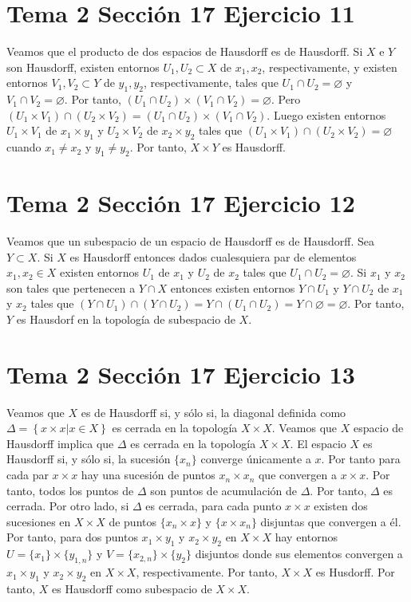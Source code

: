 \documentclass{article}
\begin{document}
\section{Tema 2 Sección 17 Ejercicio 11}
Veamos que el producto de dos espacios de Hausdorff es de Hausdorff. Si $X$ e $Y$ son Hausdorff, existen entornos $U_1,U_2\subset X$ de $x_1,x_2$, respectivamente, y existen entornos $V_1,V_2\subset Y$ de $y_1,y_2$, respectivamente, tales que $U_1\cap U_2=\varnothing$ y $V_1\cap V_2=\varnothing$. Por tanto, $(U_1\cap U_2)\times (V_1\cap V_2)=\varnothing$. Pero $(U_1\times V_1)\cap (U_2\times V_2)=(U_1\cap U_2)\times (V_1\cap V_2)$. Luego existen entornos $U_1\times V_1$ de $x_1 \times y_1$ y $U_2\times V_2$ de $x_2 \times y_2$ tales que $(U_1\times V_1)\cap (U_2\times V_2)=\varnothing$ cuando $x_1\neq  x_2$ y $y_1\neq  y_2$. Por tanto, $X\times Y$ es Hausdorff.
\section{Tema 2 Sección 17 Ejercicio 12}
Veamos que un subespacio de un espacio de Hausdorff es de Hausdorff. Sea $Y\subset X$. Si $X$ es Hausdorff entonces dados cualesquiera par de elementos $x_1,x_2\in X$ existen entornos $U_1$ de $x_1$ y $U_2$ de $x_2$ tales que $U_1\cap U_2=\varnothing$. Si $x_1$ y $x_2$ son tales que pertenecen a $Y\cap X$ entonces existen  entornos $Y\cap U_1$ y $Y\cap U_2$ de $x_1$ y $x_2$ tales que $(Y\cap U_1)\cap (Y\cap U_2)=Y\cap (U_1\cap U_2)=Y \cap \varnothing =\varnothing$. Por tanto, $Y$ es Hausdorf en la topología de subespacio de $X$.
\section{Tema 2 Sección 17 Ejercicio 13}
Veamos que $X$ es de Hausdorff si, y sólo si, la diagonal definida como $\Delta= \left\{x\times x \vert x\in X\right\}$ es cerrada en la topología $X\times X$. Veamos que $X$ espacio de Hausdorff implica que $\Delta$ es cerrada en la topología $X\times X$. El espacio $X$ es Hausdorff si, y sólo si, la sucesión $\{x_n\}$ converge únicamente a $x$. Por tanto para cada par $x\times x$ hay una sucesión de puntos $x_n\times x_n$ que convergen a $x\times  x$. Por tanto, todos los puntos de $\Delta$ son puntos de acumulación de $\Delta$. Por tanto, $\Delta$ es cerrada. Por otro lado, si $\Delta$ es cerrada, para cada punto $x\times x$ existen dos sucesiones en $X\times X$ de puntos $\{x_n\times x\}$ y $\{x\times x_n\}$ disjuntas que convergen a él. Por tanto, para dos puntos $x_1\times y_1$ y $x_2\times y_2$ en $X\times X$ hay entornos $U=\{x_1\}\times \{y_{1,n}\}$ y $V=\{x_{2,n}\}\times\{ y_2\}$ disjuntos donde sus elementos convergen a $x_1\times y_1$ y $x_2\times y_2$  en $X\times X$, respectivamente. Por tanto, $X\times X$ es Husdorff. Por tanto, $X$ es Hausdorff como subespacio de $X\times X$.
\end{document}
